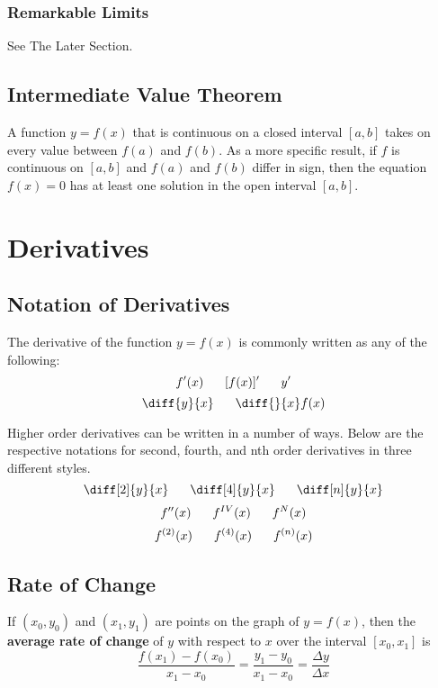 \documentclass{artikel3}
\newcommand{\ddx}{\diff{}{x}}
\begin{document}
\subsubsection{Remarkable Limits}
See The Later Section.

\subsection{Intermediate Value Theorem}
A function $y=f(x)$ that is continuous on a closed interval $[a,b]$ takes on 
every value between $f(a)$ and $f(b)$.
As a more specific result, if $f$ is continuous on $[a,b]$ and $f(a)$ and $f(b)$ 
differ in sign, then the equation $f(x)=0$ has at least one solution 
in the open interval $[a,b]$.

\section{Derivatives}

\subsection{Notation of Derivatives}
The derivative of the function $y=f(x)$ is commonly written as any of the following:
\[ f'(x)\hspace{6 mm}[f(x)]'\hspace{6 mm}y'\]
\[ \diff{y}{x}\hspace{6 mm}\ddx f(x) \]

Higher order derivatives can be written in a number of ways. Below are the 
respective notations for second, fourth, and nth order derivatives in three different styles.
\[ \diff[2]{y}{x}\hspace{6 mm}\diff[4]{y}{x}\hspace{6 mm}\diff[n]{y}{x} \]
\[ f''(x)\hspace{6 mm}f^{IV}(x)\hspace{6 mm}f^{N}(x) \]
\[ f^{(2)}(x)\hspace{6 mm}f^{(4)}(x)\hspace{6 mm}f^{(n)}(x) \]

\subsection{Rate of Change}
If $(x_0,y_0)$ and $(x_1,y_1)$ are points on the graph of $y=f(x)$, then 
the \textbf{average rate of change} of $y$ with respect to $x$ over 
the interval $[x_0,x_1]$ is
\[ \frac{f(x_1)-f(x_0)}{x_1-x_0}=\frac{y_1-y_0}{x_1-x_0}=\frac{\Delta y}{\Delta x} \]
\end{document}
